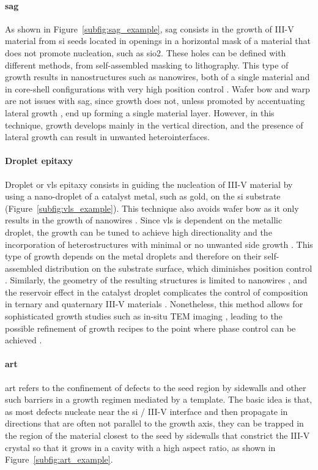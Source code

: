 \paragraph{\Acf{sag}} As shown in Figure~\ref{subfig:sag_example}, \acs{sag} consists in the growth of III-V material from \acl{si} seeds located in openings in a horizontal mask of a material that does not promote nucleation, such as \acs{sio2}. These holes can be defined with different methods, from self-assembled masking to lithography. This type of growth results in nanostructures \cite{Cantoro2012} such as nanowires, both of a single material and in core-shell configurations with very high position control \cite{Tomioka2011}. Wafer bow and warp are not issues with \acs{sag}, since growth does not, unless promoted by accentuating lateral growth \cite{McKenzie2023}, end up forming a single material layer. However, in this technique, growth develops mainly in the vertical direction, and the presence of lateral growth can result in unwanted heterointerfaces.
\par
\paragraph{Droplet epitaxy} Droplet or \acf{vls} epitaxy consists in guiding the nucleation of III-V material by using a nano-droplet of a catalyst metal, such as gold, on the \acl{si} substrate (Figure~\ref{subfig:vls_example}). This technique also avoids wafer bow as it only results in the growth of nanowires \cite{Wagner1964}. Since \acs{vls} is dependent on the metallic droplet, the growth can be tuned to achieve high directionality and the incorporation of heterostructures with minimal or no unwanted side growth \cite{Harmand2018, Joyce2007}. This type of growth depends on the metal droplets and therefore on their self-assembled distribution on the substrate surface, which diminishes position control \cite{Joyce2007}. Similarly, the geometry of the resulting structures is limited to nanowires \cite{Wagner1964}, and the reservoir effect in the catalyst droplet complicates the control of composition in ternary and quaternary III-V materials \cite{Dubrovskii2017}. Nonetheless, this method allows for sophisticated growth studies such as in-situ TEM imaging \cite{Harmand2018, Maliakkal2020, Jacobsson2016}, leading to the possible refinement of growth recipes to the point where phase control can be achieved \cite{Algra2008, Joyce2007, Caroff2009}.
\par
\paragraph{\Acf{art}} \acs{art} refers to the confinement of defects to the seed region by sidewalls and other such barriers in a growth regimen mediated by a template. The basic idea is that, as most defects nucleate near the \acl{si} / III-V interface and then propagate in directions that are often not parallel to the growth axis, they can be trapped in the region of the material closest to the seed by sidewalls that constrict the III-V crystal so that it grows in a cavity with a high aspect ratio, as shown in Figure~\ref{subfig:art_example}. 

